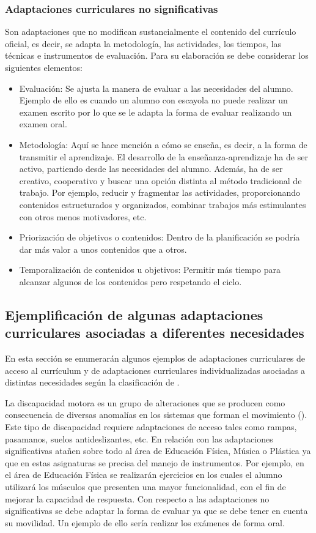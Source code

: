 \subsubsection{Adaptaciones curriculares no significativas}
Son adaptaciones que no modifican sustancialmente el contenido del currículo oficial, es decir, se adapta la metodología, las actividades, los tiempos, las técnicas e instrumentos de evaluación. Para su elaboración se debe considerar los siguientes elementos:
\begin{itemize}
    \item Evaluación: Se ajusta la manera de evaluar a las necesidades del alumno. Ejemplo de ello es cuando un alumno con escayola no puede realizar un examen escrito por lo que se le adapta la forma de evaluar realizando un examen oral.
    \item Metodología: Aquí se hace mención a cómo se enseña, es decir, a la forma de transmitir el aprendizaje. El desarrollo de la enseñanza-aprendizaje ha de ser activo, partiendo desde las necesidades del alumno. Además, ha de ser creativo, cooperativo y buscar una opción distinta al método tradicional de trabajo. Por ejemplo, reducir y fragmentar las actividades, proporcionando contenidos estructurados y organizados, combinar trabajos más estimulantes con otros menos motivadores, etc.
    \item Priorización de objetivos o contenidos: Dentro de la planificación se podría dar más valor a unos contenidos que a otros.
    \item Temporalización de contenidos u objetivos: Permitir más tiempo para alcanzar algunos de los contenidos pero respetando el ciclo.
\end{itemize}

\subsection{Ejemplificación de algunas adaptaciones curriculares asociadas a diferentes necesidades }

En esta sección se enumerarán algunos ejemplos de adaptaciones curriculares de acceso al currículum y de adaptaciones curriculares individualizadas asociadas a distintas necesidades según la clasificación de \citep*{adaptacionUNED}.

La discapacidad motora es un grupo de alteraciones que se producen como consecuencia de diversas anomalías en los sistemas que forman el movimiento (\citeauthor{disMotora}). Este tipo de discapacidad requiere  adaptaciones de acceso tales como rampas, pasamanos, suelos antideslizantes, etc. En relación con las adaptaciones significativas atañen sobre todo al área de Educación Física, Música o Plástica ya que en estas asignaturas se precisa del manejo de instrumentos. Por ejemplo, en el área de Educación Física se realizarán ejercicios en los cuales el alumno utilizará los músculos que presenten una mayor funcionalidad, con el fin de mejorar la capacidad de respuesta. Con respecto a las adaptaciones no significativas se debe adaptar la forma de evaluar ya que se debe tener en cuenta su movilidad. Un ejemplo de ello sería realizar los exámenes de forma oral.

